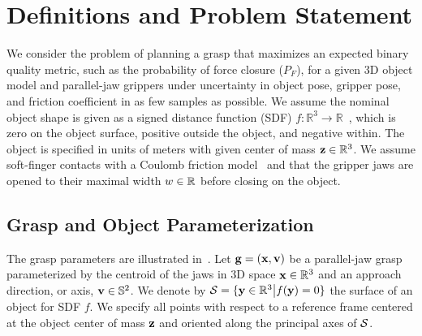 \section{Definitions and Problem Statement}

We consider the problem of planning a grasp that maximizes an expected binary quality metric, such as the probability of force closure ($P_F$), for a given 3D object model and parallel-jaw grippers under uncertainty in object pose, gripper pose, and friction coefficient in as few samples as possible.
We assume the nominal object shape is given as a signed distance function (SDF) $f: \mathbb{R}^3 \rightarrow \mathbb{R}$~\cite{mahler2015gp}, which is zero on the object surface, positive outside the object, and negative within. 
The object is specified in units of meters with given center of mass $\mathbf{z} \in \mathbb{R}^3$.
We assume soft-finger contacts with a Coulomb friction model~\cite{zheng2005} and that the gripper jaws are opened to their maximal width $w \in\mathbb{R}$ before closing on the object.

\subsection{Grasp and Object Parameterization}
The grasp parameters are illustrated in~.
Let $\mathbf{g} = (\mathbf{x}, \mathbf{v})$ be a parallel-jaw grasp parameterized by the centroid of the jaws in 3D space $\mathbf{x} \in \mathbb{R}^3$ and an approach direction, or axis, $\mathbf{v} \in \mathbb{S}^2$.
We denote by $\mathcal{S} = \{\mathbf{y} \in \mathbb{R}^3 \big| f(\mathbf{y}) = 0\}$ the surface of an object for SDF $f$.
We specify all points with respect to a reference frame centered at the object center of mass $\mathbf{z}$ and oriented along the principal axes of $\mathcal{S}$.

